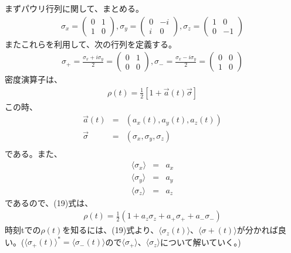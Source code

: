 \documentclass[10pt]{jreport}
\begin{document}
まずパウリ行列に関して、まとめる。
\begin{eqnarray}
\sigma_x = \left(
    \begin{array}{cc}
      0 & 1 \\
      1 & 0 
      \end{array} 
  \right) , \sigma_y = \left(
    \begin{array}{cc}
      0 & -i \\
      i & 0 
      \end{array} 
  \right) , \sigma_z =  \left(
    \begin{array}{cc}
      1 & 0 \\
      0 & -1
      \end{array} 
  \right) 
  \end{eqnarray}
またこれらを利用して、次の行列を定義する。
\begin{eqnarray}
\sigma_+ = \frac{\sigma_x+i\sigma_y}{2} 
= \left(
    \begin{array}{cc}
      0 & 1 \\
      0 & 0 
      \end{array} 
  \right) , \sigma_- = \frac{\sigma_x-i\sigma_y}{2} 
  = \left(
    \begin{array}{cc}
     0 & 0 \\
      1& 0 
      \end{array} 
  \right)
  \end{eqnarray}
  密度演算子は、
  \begin{eqnarray}
  \rho(t) =\frac{1}{2} [1+ \vec a(t) \vec \sigma]
  \end{eqnarray}
この時、
\begin{eqnarray} 
\vec{a}(t) &=& (a_x(t),a_y(t),a_z(t)) \nonumber \\
\vec{\sigma}&=& (\sigma_x,\sigma_y,\sigma_z) \nonumber \\
\end{eqnarray}
である。また、
\begin{eqnarray}
\langle \sigma_x \rangle &=& a_x \nonumber \\
\langle \sigma_y \rangle &=& a_y \nonumber \\
\langle \sigma_z \rangle &=& a_z \nonumber 
\end{eqnarray}
であるので、(19)式は、
\begin{eqnarray}
\rho(t) = \frac{1}{2}(1+a_z\sigma_z+a_+ \sigma_+ +a_- \sigma_-)
\end{eqnarray}
時刻tでの$\rho(t)$を知るには、(19)式より、$\langle \sigma_z(t) \rangle$、$\langle \sigma+(t) \rangle$が分かれば良い。($\langle \sigma_+(t)\rangle ^* = \langle\sigma_-(t) \rangle$ので$\langle \sigma_+ \rangle$、$\langle \sigma_z \rangle$について解いていく。)\\
\end{document}
